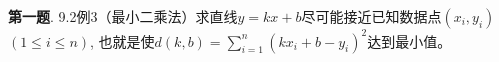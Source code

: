 \usepackage{relsize}

\renewcommand{\newpageorvspace}{\newpage}

\date{2022-5-20  第六次习题课}



\maketitle


\larger[2]


{\bf 第一题}. 9.2例3（最小二乘法）求直线$y = kx + b$尽可能接近已知数据点$(x_i, y_i)$ $(1 \leqslant i \leqslant n)$, 也就是使$d(k, b) = \sum\limits_{i=1}^n (kx_i + b - y_i)^2$达到最小值。

\newpageorvspace

